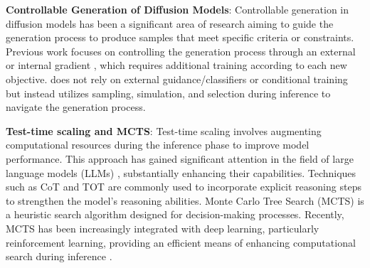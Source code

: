 \textbf{Controllable Generation of Diffusion Models}: Controllable generation in diffusion models has been a significant area of research aiming to guide the generation process to produce samples that meet specific criteria or constraints. Previous work focuses on controlling the generation process through an external or internal gradient \cite{classifierguidance, cfg}, which requires additional training according to each new objective. \proj does not rely on external guidance/classifiers or conditional training but instead utilizes sampling, simulation, and selection during inference to navigate the generation process.

\textbf{Test-time scaling and MCTS}: Test-time scaling involves augmenting computational resources during the inference phase to improve model performance. This approach has gained significant attention in the field of large language models (LLMs) \citep{brown2024large,snell2024scaling,wu2024empirical}, substantially enhancing their capabilities. Techniques such as CoT \citep{wei2022chain} and TOT \citep{yao2024tree} are commonly used to incorporate explicit reasoning steps to strengthen the model’s reasoning abilities. Monte Carlo Tree Search (MCTS) \citep{coulom2006efficient,kocsis2006bandit,gelly2006modification} is a heuristic search algorithm designed for decision-making processes. Recently, MCTS has been increasingly integrated with deep learning, particularly reinforcement learning, providing an efficient means of enhancing computational search during inference \citep{silver2016mastering,silver2017mastering,silver2018general,schrittwieser2020mastering}.

